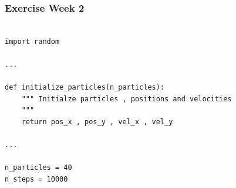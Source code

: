 \documentclass{beamer}
\begin{document}
\begin{frame}[fragile]

    \frametitle{Exercise Week 2}

\begin{lstlisting}

import random

...

def initialize_particles(n_particles):
    """ Initialze particles , positions and velocities
    """
    return pos_x , pos_y , vel_x , vel_y

...

n_particles = 40
n_steps = 10000

\end{lstlisting}

\end{frame}




\end{document}
